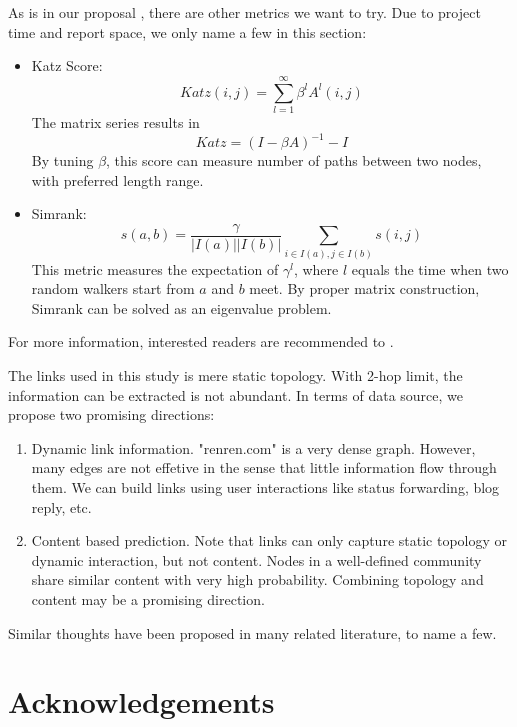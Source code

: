\documentclass[11pt,a4paper]{article}
\begin{document}
As is in our proposal \cite{hu2011-cd2hop}, there are other metrics
we want to try. Due to project time and report space, we only name 
a few in this section:
\begin{itemize}
	\item Katz Score:
			\begin{equation}
				Katz(i,j)=\sum_{l=1}^{\infty}{\beta^lA^l(i,j)}
			\end{equation}
			The matrix series results in 
			\begin{equation}
				Katz = (I-\beta A)^{-1} - I
			\end{equation}
			By tuning $\beta$, this score can measure number of paths between 
			two nodes, with preferred length range. 
	\item Simrank:
			\begin{equation}
				s(a,b)=\frac{\gamma}{|I(a)||I(b)|}
				\sum_{i \in I(a), j \in I(b)} s(i,j)
			\end{equation}
			This metric measures the expectation of $\gamma^l$, where $l$ equals 
			the time when two random walkers start from $a$ and $b$ meet. By proper 
			matrix construction, Simrank can be solved as an eigenvalue problem. 
\end{itemize}
For more information, interested readers are recommended to \cite{aggarwal2011social}. 

The links used in this study is mere static topology. 
With 2-hop limit, the information can be extracted 
is not abundant. In terms of data source, we propose 
two promising directions:
\begin{enumerate}
	\item Dynamic link information. "renren.com" is a very 
	dense graph. However, many edges are not effetive in the sense
	that little information flow through them. We can 
	build links using user interactions like status forwarding, 
	blog reply, etc. 
	\item Content based prediction. Note that links can only capture
	static topology or dynamic interaction, but not content. Nodes in a 
	well-defined community share similar content with very high 
	probability. Combining topology and content may be a promising 
	direction. 
\end{enumerate}

Similar thoughts have been proposed in many related literature, to name 
a few\cite{boccaletti2006complex,aggarwal2011social}. 

\section*{Acknowledgements}
\end{document}
